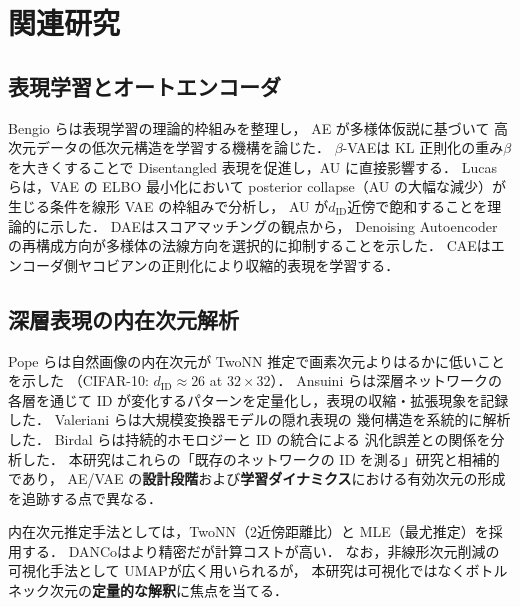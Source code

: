 \documentclass[11pt,a4paper]{jsarticle}
\begin{document}
\section{関連研究}\label{sec:related}

\subsection{表現学習とオートエンコーダ}\label{sec:related_ae}

Bengio ら\cite{bengio2013representation}は表現学習の理論的枠組みを整理し，
AE が多様体仮説\cite{fefferman2016manifold}に基づいて
高次元データの低次元構造を学習する機構を論じた．
$\beta$-VAE\cite{higgins2017betavae}は KL 正則化の重み$\beta$を大きくすることで
Disentangled 表現を促進し，AU に直接影響する．
Lucas ら\cite{lucas2019elbo}は，VAE の ELBO 最小化において
posterior collapse（AU の大幅な減少）が生じる条件を線形 VAE の枠組みで分析し，
AU が$d_{\mathrm{ID}}$近傍で飽和することを理論的に示した．
DAE\cite{alain2014dae}はスコアマッチングの観点から，
Denoising Autoencoder の再構成方向が多様体の法線方向を選択的に抑制することを示した．
CAE\cite{rifai2011cae}はエンコーダ側ヤコビアンの正則化により収縮的表現を学習する．

\subsection{深層表現の内在次元解析}\label{sec:related_id}

Pope ら\cite{pope2021intrinsic}は自然画像の内在次元が
TwoNN 推定で画素次元よりはるかに低いことを示した
（CIFAR-10: $d_\mathrm{ID} \approx 26$ at $32 \times 32$）．
Ansuini ら\cite{ansuini2019intrinsic}は深層ネットワークの各層を通じて
ID が変化するパターンを定量化し，表現の収縮・拡張現象を記録した．
Valeriani ら\cite{valeriani2023geometry}は大規模変換器モデルの隠れ表現の
幾何構造を系統的に解析した．
Birdal ら\cite{birdal2021intrinsic}は持続的ホモロジーと ID の統合による
汎化誤差との関係を分析した．
本研究はこれらの「既存のネットワークの ID を測る」研究と相補的であり，
AE/VAE の\textbf{設計段階}および\textbf{学習ダイナミクス}における有効次元の形成を追跡する点で異なる．

内在次元推定手法としては，TwoNN\cite{facco2017twonn}（2近傍距離比）と
MLE\cite{levina2005mle}（最尤推定）を採用する．
DANCo\cite{ceruti2014danco}はより精密だが計算コストが高い．
なお，非線形次元削減の可視化手法として UMAP\cite{mcinnes2018umap}が広く用いられるが，
本研究は可視化ではなくボトルネック次元の\textbf{定量的な解釈}に焦点を当てる．
\end{document}

